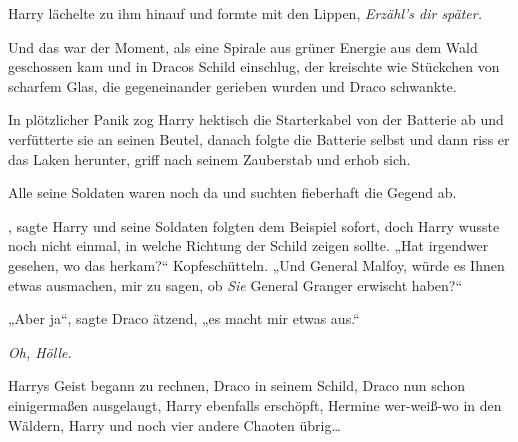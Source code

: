 Harry lächelte zu ihm hinauf und formte mit den Lippen, \emph{Erzähl’s dir später.}

Und das war der Moment, als eine Spirale aus grüner Energie aus dem Wald geschossen kam und in Dracos Schild einschlug, der kreischte wie Stückchen von scharfem Glas, die gegeneinander gerieben wurden und Draco schwankte.

In plötzlicher Panik zog Harry hektisch die Starterkabel von der Batterie ab und verfütterte sie an seinen Beutel, danach folgte die Batterie selbst und dann riss er das Laken herunter, griff nach seinem Zauberstab und erhob sich.

Alle seine Soldaten waren noch da und suchten fieberhaft die Gegend ab.

, sagte Harry und seine Soldaten folgten dem Beispiel sofort, doch Harry wusste noch nicht einmal, in welche Richtung der Schild zeigen sollte. „Hat irgendwer gesehen, wo das herkam?“ Kopfeschütteln. „Und General Malfoy, würde es Ihnen etwas ausmachen, mir zu sagen, ob \emph{Sie} General Granger erwischt haben?“

„Aber ja“, sagte Draco ätzend, „es macht mir etwas aus.“

\emph{Oh, Hölle.}

Harrys Geist begann zu rechnen, Draco in seinem Schild, Draco nun schon einigermaßen ausgelaugt, Harry ebenfalls erschöpft, Hermine wer-weiß-wo in den Wäldern, Harry und noch vier andere Chaoten übrig…

